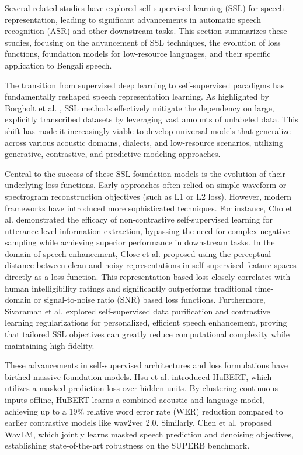 Several related studies have explored self-supervised learning (SSL) for speech representation, leading to significant advancements in automatic speech recognition (ASR) and other downstream tasks. This section summarizes these studies, focusing on the advancement of SSL techniques, the evolution of loss functions, foundation models for low-resource languages, and their specific application to Bengali speech.

The transition from supervised deep learning to self-supervised paradigms has fundamentally reshaped speech representation learning. As highlighted by Borgholt et al. \cite{borgholt2022brief}, SSL methods effectively mitigate the dependency on large, explicitly transcribed datasets by leveraging vast amounts of unlabeled data. This shift has made it increasingly viable to develop universal models that generalize across various acoustic domains, dialects, and low-resource scenarios, utilizing generative, contrastive, and predictive modeling approaches.

Central to the success of these SSL foundation models is the evolution of their underlying loss functions. Early approaches often relied on simple waveform or spectrogram reconstruction objectives (such as L1 or L2 loss). However, modern frameworks have introduced more sophisticated techniques. For instance, Cho et al. \cite{cho2022noncontrastive} demonstrated the efficacy of non-contrastive self-supervised learning for utterance-level information extraction, bypassing the need for complex negative sampling while achieving superior performance in downstream tasks. In the domain of speech enhancement, Close et al. \cite{close2023perceive} proposed using the perceptual distance between clean and noisy representations in self-supervised feature spaces directly as a loss function. This representation-based loss closely correlates with human intelligibility ratings and significantly outperforms traditional time-domain or signal-to-noise ratio (SNR) based loss functions. Furthermore, Sivaraman et al. \cite{sivaraman2021efficient} explored self-supervised data purification and contrastive learning regularizations for personalized, efficient speech enhancement, proving that tailored SSL objectives can greatly reduce computational complexity while maintaining high fidelity.

These advancements in self-supervised architectures and loss formulations have birthed massive foundation models. Hsu et al. \cite{hsu2021hubert} introduced HuBERT, which utilizes a masked prediction loss over hidden units. By clustering continuous inputs offline, HuBERT learns a combined acoustic and language model, achieving up to a 19\% relative word error rate (WER) reduction compared to earlier contrastive models like wav2vec 2.0. Similarly, Chen et al. \cite{chen2021wavlm} proposed WavLM, which jointly learns masked speech prediction and denoising objectives, establishing state-of-the-art robustness on the SUPERB benchmark.


